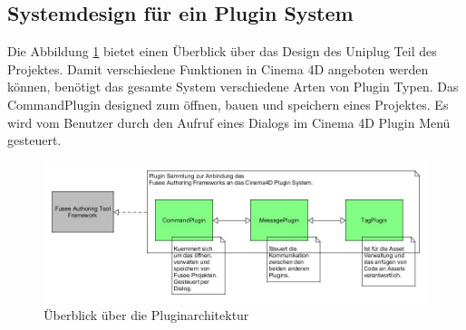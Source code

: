 \documentclass[pagesize, paper=a4, fontsize=12pt, titlepage=true, headings=small, headnosepline, abstractoff, liststotoc, nochapterprefix, plainheadsepline, twoside]{scrreprt}
\begin{document}
\subsection{Systemdesign für ein Plugin System}
Die Abbildung \ref{ÜberblickPluginArchitektur} bietet einen Überblick über das Design des Uniplug Teil des Projektes. Damit verschiedene Funktionen in Cinema 4D angeboten werden können, benötigt das gesamte System verschiedene Arten von Plugin Typen. Das CommandPlugin designed zum öffnen, bauen und speichern eines Projektes. Es wird vom Benutzer durch den Aufruf eines Dialogs im Cinema 4D Plugin Menü gesteuert.

\begin{figure}[ht]
	\centering
	\includegraphics[width=\linewidth]{Bilder/Ueberblick_Plugins.jpg}
	\caption{Überblick über die Pluginarchitektur}
	\label{ÜberblickPluginArchitektur}
\end{figure}
\end{document}
